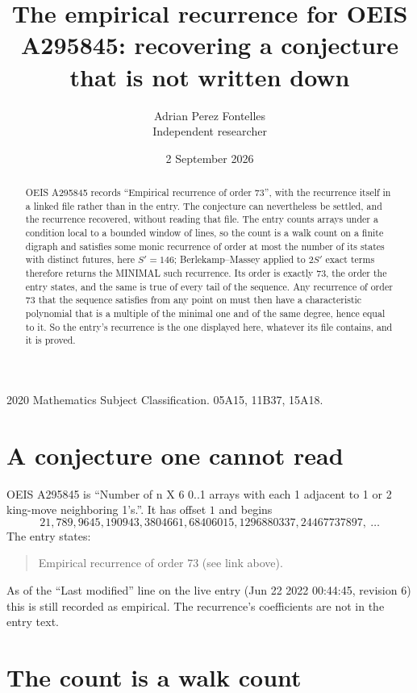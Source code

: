 \documentclass[11pt,a4paper]{article}
\title{The empirical recurrence for OEIS A295845: recovering a conjecture that is not written down}
\author{Adrian Perez Fontelles\\ \small Independent researcher}
\date{2 September 2026}
\theoremstyle{plain}
\theoremstyle{definition}
\begin{document}
\maketitle

\begin{abstract}
OEIS A295845 records ``Empirical recurrence of order $73$'', with the recurrence itself in a
linked file rather than in the entry. The conjecture can nevertheless be settled, and the
recurrence recovered, without reading that file. The entry counts arrays under a condition
local to a bounded window of lines, so the count is a walk count on a finite digraph and
satisfies some monic recurrence of order at most the number of its states with distinct
futures, here $S'=146$; Berlekamp--Massey applied to $2S'$ exact
terms therefore returns the MINIMAL such recurrence. Its order is exactly $73$, the order
the entry states, and the same is true of every tail of the sequence. Any recurrence of order
$73$ that the sequence satisfies from any point on must then have a characteristic
polynomial that is a multiple of the minimal one and of the same degree, hence equal to it. So
the entry's recurrence is the one displayed here, whatever its file contains, and it is
proved.
\end{abstract}

\noindent\small 2020 Mathematics Subject Classification. 05A15, 11B37, 15A18.\normalsize

\section{A conjecture one cannot read}

OEIS A295845 is ``Number of n X 6 0..1 arrays with each 1 adjacent to 1 or 2 king-move neighboring 1's.''. It has offset $1$ and begins
\[
21, 789, 9645, 190943, 3804661, 68406015, 1296880337, 24467737897,\ \dots
\]
The entry states:
\begin{quote}
Empirical recurrence of order 73 (see link above).
\end{quote}
As of the ``Last modified'' line on the live entry (Jun 22 2022 00:44:45, revision 6) this is still
recorded as empirical. The recurrence's coefficients are not in the entry text.

\section{The count is a walk count}
\end{document}
